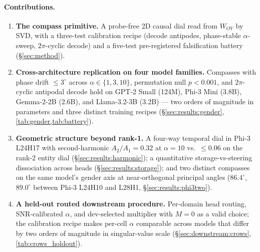 \paragraph{Contributions.}
\begin{enumerate}
\itemsep0pt
\item \textbf{The compass primitive.} A probe-free 2D causal dial
read from $W_{OV}$ by SVD, with a three-test calibration recipe
(decode antipodes, phase-stable $\alpha$-sweep, $2\pi$-cyclic
decode) and a five-test pre-registered falsification battery
(\S\ref{sec:method}).
\item \textbf{Cross-architecture replication on four model
families.} Compasses with phase drift $\leq 3^\circ$ across
$\alpha \in \{1, 3, 10\}$, permutation null $p < 0.001$, and
$2\pi$-cyclic antipodal decode hold on GPT-2 Small (124M),
Phi-3 Mini (3.8B), Gemma-2-2B (2.6B), and Llama-3.2-3B (3.2B) ---
two orders of magnitude in parameters and three distinct training
recipes (\S\ref{sec:results:gender},
\cref{tab:gender,tab:battery}).
\item \textbf{Geometric structure beyond rank-1.} A four-way
temporal dial in Phi-3 L24H17 with second-harmonic
$A_2/A_1 = 0.32$ at $\alpha = 10$ vs.\ $\leq 0.06$ on the rank-2
entity dial (\S\ref{sec:results:harmonic}); a quantitative
storage-vs-steering dissociation across heads
(\S\ref{sec:results:storage}); and two distinct compasses on the
same model's gender axis at near-orthogonal principal angles
($86.4^\circ$, $89.0^\circ$ between Phi-3 L24H10 and L28H1,
\S\ref{sec:results:phi3two}).
\item \textbf{A held-out routed downstream procedure.}
Per-domain head routing, SNR-calibrated $\alpha$, and dev-selected
multiplier with $M = 0$ as a valid choice; the calibration recipe
makes per-cell $\alpha$ comparable across models that differ by
two orders of magnitude in singular-value scale
(\S\ref{sec:downstream:crows}, \cref{tab:crows_holdout}).
\end{enumerate}
